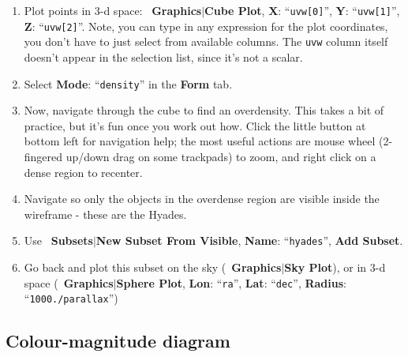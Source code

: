\documentclass{article}
\newcommand{\buttimg}[1]
           {\mbox{\vtop{\vskip-2ex\hbox{\texttt{[image: \#1]}}}}}
\newcommand{\winfig}[2]
           {\vspace*{-0.5cm}
            \hspace*{0.5cm}\mbox{\vtop{\hbox{\texttt{[image: \#2]}}}}}
\newcommand{\lab}[1]{{\bf #1}}
\newcommand{\mb}[3]{\buttimg{#1}~\lab{#2}$\mid$\lab{#3}}
\newcommand{\entry}[2]{\lab{#1}: ``{\tt #2}''}
\begin{document}
\begin{minipage}[t]{11cm}
  \raggedright
  \begin{enumerate}
  \item Plot points in 3-d space:
        \mb{plot2cube.png}{Graphics}{Cube Plot},
        \entry{X}{uvw[0]},
        \entry{Y}{uvw[1]},
        \entry{Z}{uvw[2]}.
        Note, you can type in any expression for the plot coordinates,
        you don't have to just select from available columns.
        The {\tt uvw} column itself doesn't appear in the selection list,
        since it's not a scalar.
  \item Select \entry{Mode}{\buttimg{MODE_DENSITY.png}density}
        in the \lab{Form} tab.
  \item Now, navigate through the cube to find an overdensity.
        This takes a bit of practice, but it's fun once you work out how.
        Click the little \buttimg{navig_help.png} button at bottom left
        for navigation help;
        the most useful actions are mouse wheel
        (2-fingered up/down drag on some trackpads) to zoom,
        and right click on a dense region to recenter.
  \item Navigate so only the objects in the overdense region are
        visible inside the wireframe - these are the Hyades.
  \item Use \mb{spoints5.png}{Subsets}{New Subset From Visible},
        \entry{Name}{hyades}, \lab{Add Subset}.
  \item Go back and plot this subset on the sky
        (\mb{skyplot_button.png}{Graphics}{Sky Plot}),
        or in 3-d space
        (\mb{plot2sphere.png}{Graphics}{Sphere Plot},
         \entry{Lon}{ra},
         \entry{Lat}{dec},
         \entry{Radius}{1000./parallax})
  \end{enumerate}
\end{minipage}
\begin{minipage}[t]{8cm}
  \winfig{width=8cm}{hy_phase.png}
\end{minipage}

\newpage
\subsection{Colour-magnitude diagram}
\end{document}
